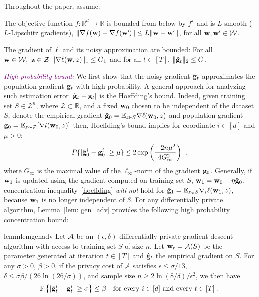 \documentclass[11pt]{article}
\begin{document}
Throughout the paper, assume:
\begin{assumption}
The objective function $ f: \mathbb{R}^d \rightarrow \mathbb{R}$ is bounded from below by $f^\star$ and is $L$-smooth ($L$-Lipschitz gradients), \ie$\nonumber \|\nabla f(\mathbf{w}) -\nabla f(\mathbf{w}^\prime) \|\leq L \|\mathbf{w}-\mathbf{w}^\prime \|$, for all $\w, \w^\prime \in \cW$.
\end{assumption}
\begin{assumption}
The gradient of $\ell$ and its noisy approximation are bounded: For all $\w \in \cW, \  \z \in \cZ$ $\|\nabla \ell (\mathbf{w}, z) \|_1 \leq G_1$ and for all $t \in [T]$, $\|\tilde {\mathbf{g}}_t\|_2 \leq G$.
\end{assumption}


\textcolor{purple}{\textit{High-probability bound:}}
We first show that the noisy gradient $\tilde {\mathbf{g}}_t$ approximates the population gradient $\mathbf{g}_t$ with high probability.
A general approach for analyzing such estimation error $| \tilde {\mathbf{g}}_t - \mathbf{g}_t|$ is the Hoeffding's bound. 
Indeed, given training set $S \in \mathcal{Z}^n$, where $\mathcal{Z} \subset \mathbb{R}$, and a fixed $\mathbf{w}_0$ chosen to be independent of the dataset $S$, denote the empirical gradient $\hat {\mathbf{g}}_0= \mathbb{E}_{z \in S}\nabla \ell(\mathbf{w}_0,z)$ and population gradient $\mathbf{g}_0 = \mathbb{E}_{z\sim \mathcal{P}}[\nabla l(\mathbf{w}_0,z)]$ then, Hoeffding's bound implies for coordinate $i \in [d]$ and $\mu > 0$:
\begin{equation} \label{hoeffding}
P\{|\hat {\mathbf{g}}^i_0 - \mathbf{g}_0^i | \geq \mu \} \leq2 \exp \left(\frac{-2n\mu^2}{4G_\infty^2} \right)~,
\end{equation}
 where $G_\infty$ is the maximal value of the $\ell_\infty$-norm of the gradient $ \mathbf{g}_0$. 
Generally, if $\mathbf{w}_1$ is updated using the gradient computed on training set $S$, \ie $\mathbf{w}_1 = \mathbf{w}_0 - \eta \hat {\mathbf{g}}_0$, concentration inequality~\eqref{hoeffding} \emph{will not} hold for $\hat {\mathbf{g}}_1 = \mathbb{E}_{z \in S}\nabla_i \ell(\mathbf{w}_1,z)$, because $\mathbf{w}_1$ is no longer independent of $S$. 
For any differentially private algorithm, Lemma~\ref{lem: gen_adv} provides the following high probability concentration bound:  
\begin{restatable}{lemm}{lemgenadv}
\label{lem: gen_adv}
	Let $\cA$ be an $(\epsilon, \delta)$-differentially private gradient descent algorithm with access to training set $S$ of size $n$. Let $\w_t = \cA(S)$ be the parameter generated at iteration $t \in [T]$ and $\hat {\mathbf{g}}_t$ the empirical gradient on $S$. For any $\sigma >0$, $\beta > 0$, if the privacy cost of $\cA$ satisfies $\epsilon \leq \sigma/13$, $\delta \leq \sigma \beta/(26 \ln(26/\sigma))$, and sample size $n \geq 2\ln(8/\delta)/\epsilon^2$, we then have
	\begin{equation*}
	\mathbb{P}\left\{ |\hat {\mathbf{g}}_t^i - \mathbf{g}_t^i| \geq  \sigma \right\} \leq \beta \quad \textrm{for every $ i\in [d]$ and every $t \in [T]$} ~.
	\end{equation*} 
\end{restatable}
\end{document}
